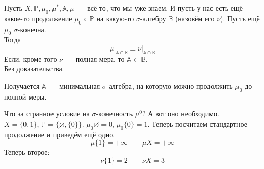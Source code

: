 \documentclass{article}
\begin{document}
    \begin{theorem}
        Пусть $X,\mathbb P,\mu_0,\mu^*,\mathbb A,\mu$~--- всё то, что мы уже знаем. И пусть у нас есть ещё какое-то продолжение $\mu_0$ с $\mathbb P$ на какую-то $\sigma$-алгебру $\mathbb B$ (назовём его $\nu$). Пусть ещё $\mu_0$ $\sigma$-конечна.\\
        Тогда
        $$
        \mu\Big|_{\mathbb A\cap\mathbb B}\equiv\nu\Big|_{\mathbb A\cap\mathbb B}
        $$
        Если, кроме того $\nu$~--- полная мера, то $\mathbb A\subset\mathbb B$.\\
        Без доказательства.
    \end{theorem}
    \begin{corollary}
        Получается $\mathbb A$~--- минимальная $\sigma$-алгебра, на которую можно продолжить $\mu_0$ до полной меры.
    \end{corollary}
    \begin{example}
        Что за странное условие на $\sigma$-конечность $\mu^0$? А вот оно необходимо.\\
        $X=\{0,1\}$, $\mathbb P=\{\varnothing,\{0\}\}$. $\mu_0\varnothing=0$, $\mu_0\{0\}=1$. Теперь посчитаем стандартное продолжение и приведём ещё одно.\\
        $$
        \mu\{1\}=+\infty\qquad\mu X=+\infty
        $$
        Теперь второе:
        $$
        \nu\{1\}=2\qquad\nu X=3
        $$
    \end{example}
\end{document}
